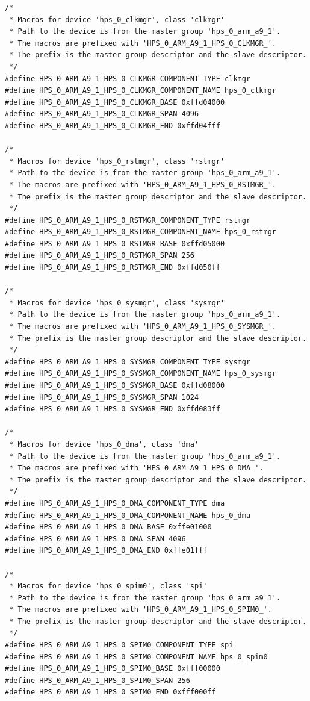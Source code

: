 \documentclass[conference]{IEEEtran}
\begin{document}
\begin{lstlisting}
/*
 * Macros for device 'hps_0_clkmgr', class 'clkmgr'
 * Path to the device is from the master group 'hps_0_arm_a9_1'.
 * The macros are prefixed with 'HPS_0_ARM_A9_1_HPS_0_CLKMGR_'.
 * The prefix is the master group descriptor and the slave descriptor.
 */
#define HPS_0_ARM_A9_1_HPS_0_CLKMGR_COMPONENT_TYPE clkmgr
#define HPS_0_ARM_A9_1_HPS_0_CLKMGR_COMPONENT_NAME hps_0_clkmgr
#define HPS_0_ARM_A9_1_HPS_0_CLKMGR_BASE 0xffd04000
#define HPS_0_ARM_A9_1_HPS_0_CLKMGR_SPAN 4096
#define HPS_0_ARM_A9_1_HPS_0_CLKMGR_END 0xffd04fff

/*
 * Macros for device 'hps_0_rstmgr', class 'rstmgr'
 * Path to the device is from the master group 'hps_0_arm_a9_1'.
 * The macros are prefixed with 'HPS_0_ARM_A9_1_HPS_0_RSTMGR_'.
 * The prefix is the master group descriptor and the slave descriptor.
 */
#define HPS_0_ARM_A9_1_HPS_0_RSTMGR_COMPONENT_TYPE rstmgr
#define HPS_0_ARM_A9_1_HPS_0_RSTMGR_COMPONENT_NAME hps_0_rstmgr
#define HPS_0_ARM_A9_1_HPS_0_RSTMGR_BASE 0xffd05000
#define HPS_0_ARM_A9_1_HPS_0_RSTMGR_SPAN 256
#define HPS_0_ARM_A9_1_HPS_0_RSTMGR_END 0xffd050ff

/*
 * Macros for device 'hps_0_sysmgr', class 'sysmgr'
 * Path to the device is from the master group 'hps_0_arm_a9_1'.
 * The macros are prefixed with 'HPS_0_ARM_A9_1_HPS_0_SYSMGR_'.
 * The prefix is the master group descriptor and the slave descriptor.
 */
#define HPS_0_ARM_A9_1_HPS_0_SYSMGR_COMPONENT_TYPE sysmgr
#define HPS_0_ARM_A9_1_HPS_0_SYSMGR_COMPONENT_NAME hps_0_sysmgr
#define HPS_0_ARM_A9_1_HPS_0_SYSMGR_BASE 0xffd08000
#define HPS_0_ARM_A9_1_HPS_0_SYSMGR_SPAN 1024
#define HPS_0_ARM_A9_1_HPS_0_SYSMGR_END 0xffd083ff

/*
 * Macros for device 'hps_0_dma', class 'dma'
 * Path to the device is from the master group 'hps_0_arm_a9_1'.
 * The macros are prefixed with 'HPS_0_ARM_A9_1_HPS_0_DMA_'.
 * The prefix is the master group descriptor and the slave descriptor.
 */
#define HPS_0_ARM_A9_1_HPS_0_DMA_COMPONENT_TYPE dma
#define HPS_0_ARM_A9_1_HPS_0_DMA_COMPONENT_NAME hps_0_dma
#define HPS_0_ARM_A9_1_HPS_0_DMA_BASE 0xffe01000
#define HPS_0_ARM_A9_1_HPS_0_DMA_SPAN 4096
#define HPS_0_ARM_A9_1_HPS_0_DMA_END 0xffe01fff

/*
 * Macros for device 'hps_0_spim0', class 'spi'
 * Path to the device is from the master group 'hps_0_arm_a9_1'.
 * The macros are prefixed with 'HPS_0_ARM_A9_1_HPS_0_SPIM0_'.
 * The prefix is the master group descriptor and the slave descriptor.
 */
#define HPS_0_ARM_A9_1_HPS_0_SPIM0_COMPONENT_TYPE spi
#define HPS_0_ARM_A9_1_HPS_0_SPIM0_COMPONENT_NAME hps_0_spim0
#define HPS_0_ARM_A9_1_HPS_0_SPIM0_BASE 0xfff00000
#define HPS_0_ARM_A9_1_HPS_0_SPIM0_SPAN 256
#define HPS_0_ARM_A9_1_HPS_0_SPIM0_END 0xfff000ff


\end{lstlisting}
\end{document}
